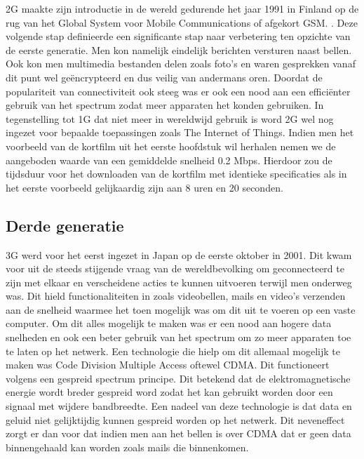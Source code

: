 2G maakte zijn introductie in de wereld gedurende het jaar 1991 in Finland op de rug van het Global System voor Mobile Communications of afgekort GSM. \autocite{Galazzo2020}. Deze volgende stap definieerde een significante stap naar verbetering ten opzichte van de eerste generatie. Men kon namelijk eindelijk berichten versturen naast bellen. Ook kon men multimedia bestanden delen zoals foto's en waren gesprekken vanaf dit punt wel geëncrypteerd en dus veilig van andermans oren. Doordat de populariteit van connectiviteit ook steeg was er ook een nood aan een efficiënter gebruik van het spectrum zodat meer apparaten het konden gebruiken. In tegenstelling tot 1G dat niet meer in wereldwijd gebruik is word 2G wel nog ingezet voor bepaalde toepassingen zoals The Internet of Things. \autocite{Henke2021} Indien men het voorbeeld van de kortfilm uit het eerste hoofdstuk wil herhalen nemen we de aangeboden waarde van een gemiddelde snelheid 0.2 Mbps. \autocite{Galazzo2020} Hierdoor zou de tijdsduur voor het downloaden van de kortfilm met identieke specificaties als in het eerste voorbeeld gelijkaardig zijn aan 8 uren en 20 seconden. \autocite{Wooding2024}

\subsection{Derde generatie}

3G werd voor het eerst ingezet in Japan op de eerste oktober in 2001. Dit kwam voor uit de steeds stijgende vraag van de wereldbevolking om geconnecteerd te zijn met elkaar en verscheidene acties te kunnen uitvoeren terwijl men onderweg was. Dit hield functionaliteiten in zoals videobellen, mails en video's verzenden aan de snelheid waarmee het toen mogelijk was om dit uit te voeren op een vaste computer. Om dit alles mogelijk te maken was er een nood aan hogere data snelheden en ook een beter gebruik van het spectrum om zo meer apparaten toe te laten op het netwerk. \autocite{Dulcey2020} Een technologie die hielp om dit allemaal mogelijk te maken was Code Division Multiple Access oftewel CDMA. Dit functioneert volgens een gespreid spectrum principe. Dit betekend dat de elektromagnetische energie wordt breder gespreid word zodat het kan gebruikt worden door een signaal met wijdere bandbreedte. Een nadeel van deze technologie is dat data en geluid niet gelijktijdig kunnen gespreid worden op het netwerk. Dit neveneffect zorgt er dan voor dat indien men aan het bellen is over CDMA dat er geen data binnengehaald kan worden zoals mails die binnenkomen. \autocite{Fendelman2021}    

